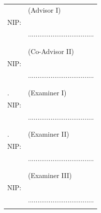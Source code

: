 \noindent
\begin{tabularx}{\textwidth}{X l}
  \advisor{}               & (Advisor I)                         \\
  NIP: \advisornip{}       &                                     \\
                           & ................................... \\
                           &                                     \\
                           &                                     \\
  \coadvisor{}             & (Co-Advisor II)                     \\
  NIP: \coadvisornip{}     &                                     \\
                           & ................................... \\
                           &                                     \\
                           &                                     \\
  \examinerone{}.          & (Examiner I)                        \\
  NIP: \examineronenip{}   &                                     \\
                           & ................................... \\
                           &                                     \\
                           &                                     \\
  \examinertwo{}.          & (Examiner II)                       \\
  NIP: \examinertwonip{}   &                                     \\
                           & ................................... \\
                           &                                     \\
                           &                                     \\


\ifbool{bpenguji3}{
  \examinerthree{}.        & (Examiner III)                      \\
  NIP: \examinerthreenip{} &                                     \\
                           & ................................... \\
}
\end{tabularx}
\endgroup

